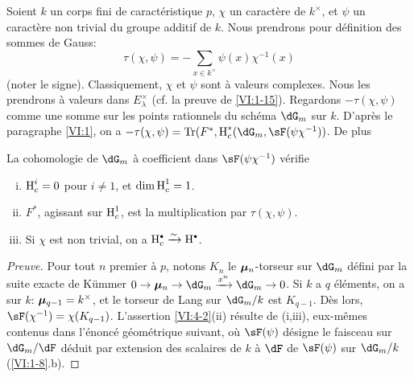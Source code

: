 Soient $k$ un corps fini de caractéristique $p$, $\chi$ un caractère de 
$k^\times$, et $\psi$ un caractère non trivial du groupe additif de $k$. Nous 
prendrons pour définition des sommes de Gauss: 
\begin{equation*}\tag{4.1.1}\label{VI:eq:4-1-1}
  \tau(\chi,\psi) = -\sum_{x\in k^\times} \psi(x) \chi^{-1}(x) 
\end{equation*}
(noter le signe). Classiquement, $\chi$ et $\psi$ sont à valeurs complexes. 
Nous les prendrons à valeurs dans $E_\lambda^\times$ (cf. la preuve de 
\ref{VI:1-15}). Regardons $-\tau(\chi,\psi)$ comme une somme sur les points 
rationnels du schéma $\dG_m$ sur $k$. D'après le paragraphe \ref{VI:1}, 
on a $-\tau(\chi,\psi) = \tr(F^\ast,\h_c^\ast(\dG_m,\sF(\psi \chi^{-1}))$. De 
plus 





\begin{proposition_}\label{VI:4-2}
La cohomologie de $\dG_m$ à coefficient dans $\sF(\psi\chi^{-1})$ vérifie 
\begin{enumerate}[(i)]
  \item $\operatorname{H}_c^i=0$ pour $i\ne 1$, et $\dim \operatorname{H}_c^1=1$. 
  \item $F^\ast$, agissant sur $\operatorname{H}_c^1$, est la multiplication par 
    $\tau(\chi,\psi)$. 
  \item Si $\chi$ est non trivial, on a $\h_c^\bullet \iso \h^\bullet$. 
\end{enumerate}
\end{proposition_}
\begin{proof}[Preuve]
Pour tout $n$ premier à $p$, notons $K_n$ le ${\bm\mu}_n$-torseur sur $\dG_m$ 
défini par la suite exacte de K\"ummer 
$0 \to \dmu_n \to \dG_m \xrightarrow{x^n} \dG_m \to 0$. Si $k$ a $q$ 
éléments, on a sur $k$: ${\bm\mu}_{q-1}=k^\times$, et le torseur de Lang sur 
$\dG_m/k$ est $K_{q-1}$. Dès lors, $\sF(\chi^{-1})=\chi(K_{q-1})$. 
L'assertion \ref{VI:4-2}(ii) résulte de (i,iii), eux-mêmes contenus dans 
l'énoncé géométrique suivant, où $\sF(\psi)$ désigne le faisceau 
sur $\dG_m/\dF$ déduit par extension des scalaires de $k$ à $\dF$ de 
$\sF(\psi)$ sur $\dG_m/k$ (\ref{VI:1-8}.b). 
\end{proof}





